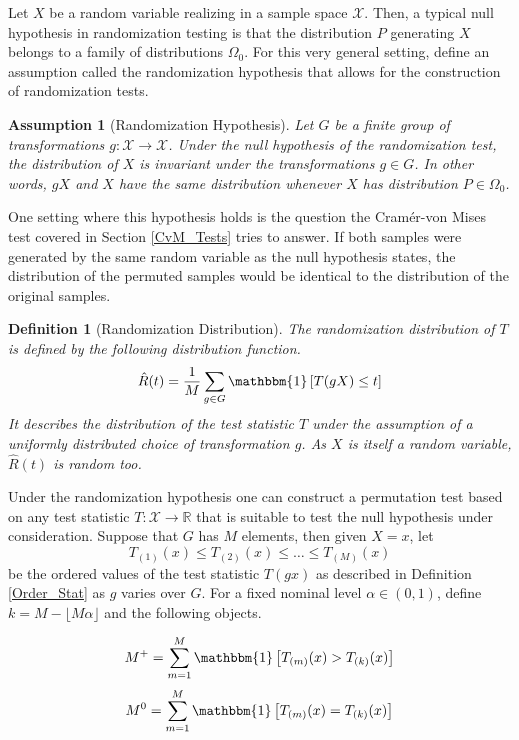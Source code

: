 \documentclass[12pt, a4paper]{article}
\theoremstyle{MAstyle} \newtheorem{assumption}{Assumption}[section]
\theoremstyle{MAstyle} \newtheorem{definition}{Definition}[section]
\theoremstyle{MAstyle} \newtheorem{theorem}{Theorem}[section]
\begin{document}
			Let $X$ be a random variable realizing in a sample space $\mathcal{X}$. Then, a typical null hypothesis in randomization testing is that the distribution $P$ generating $X$ belongs to a family of distributions $\Omega_0$. For this very general setting, \cite{lehmann_testing_2005} define an assumption called the randomization hypothesis that allows for the construction of randomization tests.
			\begin{assumption}[Randomization Hypothesis]\label{rand_hypo}
				 Let $G$ be a finite group of transformations $g: \mathcal{X} \rightarrow \mathcal{X}$. Under the null hypothesis of the randomization test, the distribution of $X$ is invariant under the transformations $g \in G$. In other words, $gX$ and $X$ have the same distribution whenever $X$ has distribution $P \in \Omega_0$.
			\end{assumption}
			One setting where this hypothesis holds is the question the Cram\'{e}r-von Mises test covered in Section \ref{CvM_Tests} tries to answer. If both samples were generated by the same random variable as the null hypothesis states, the distribution of the permuted samples would be identical to the distribution of the original samples.
			\begin{definition}[Randomization Distribution]\label{rand_dist}
				The randomization distribution of $T$ is defined by the following distribution function.
				$$\hat{R}(t) = \frac{1}{M} \sum_{g \in G} \mathbbm{1} \left[T(gX) \leq t\right]$$
				It describes the distribution of the test statistic $T$ under the assumption of a uniformly distributed choice of transformation $g$. As $X$ is itself a random variable, $\hat{R}(t)$ is random too.
			\end{definition}
			
			Under the randomization hypothesis one can construct a permutation test based on any test statistic $T:\mathcal{X} \rightarrow \mathbb{R}$ that is suitable to test the null hypothesis under consideration. Suppose that $G$ has $M$ elements, then given $X = x$, let 
			$$T_{(1)}(x) \leq T_{(2)}(x) \leq \dots \leq T_{(M)}(x) $$
			be the ordered values of the test statistic $T(gx)$ as described in Definition \ref{Order_Stat} as $g$ varies over $G$. For a fixed nominal level $\alpha \in (0,1)$, define $k = M - \lfloor M\alpha \rfloor$ and the following objects.
			\begin{multicols}{2}
				\noindent
				\begin{equation*}
					M^{+} = \sum_{m = 1}^{M}\mathbbm{1}\left[T_{(m)}(x) > T_{(k)}(x)\right]
				\end{equation*}
				\begin{equation}
					M^{0} = \sum_{m = 1}^{M}\mathbbm{1}\left[T_{(m)}(x) = T_{(k)}(x)\right]
				\end{equation}
			\end{multicols}
			
\end{document}
